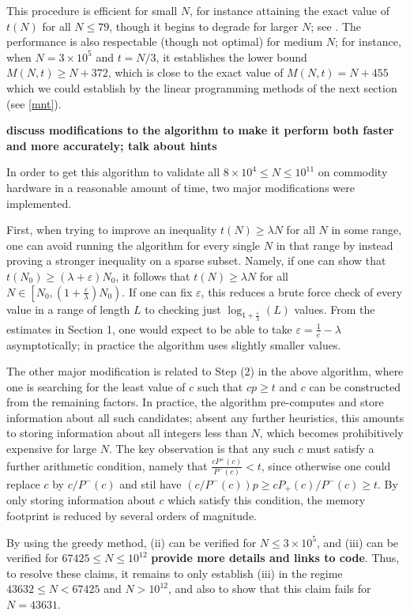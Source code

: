 \documentclass[12pt,a4paper,reqno]{amsart}
\numberwithin{equation}{section}
\theoremstyle{plain}
\theoremstyle{definition}
\newcommand\eps{\varepsilon}
\begin{document}
This procedure is efficient for small $N$, for instance attaining the exact value of $t(N)$ for all $N \leq 79$, though it begins to degrade for larger $N$; see .  The performance is also respectable (though not optimal) for medium $N$; for instance, when $N=3 \times 10^5$ and $t=N/3$, it establishes the lower bound $M(N,t) \geq N+372$, which is close to the exact value of $M(N,t) = N+455$ which we could establish by the linear programming methods of the next section (see \eqref{mnt}).

{\bf discuss modifications to the algorithm to make it perform both faster and more accurately; talk about hints}

In order to get this algorithm to validate all $8 \times 10^4 \leq N \leq 10^{11}$ on commodity hardware in a reasonable amount of time, two major modifications were implemented. 

First, when trying to improve an inequality $t(N) \geq \lambda N$ for all $N$ in some range, one can avoid running the algorithm for every single $N$ in that range by instead proving a stronger inequality on a sparse subset. Namely, if one can show that $t(N_0) \geq (\lambda + \eps)N_0$, it follows that $t(N) \geq \lambda N$ for all $N \in \left[N_0, (1+\frac{\eps}{\lambda})N_0\right)$. If one can fix $\eps$, this reduces a brute force check of every value in a range of length $L$ to checking just $\log_{1+\frac{\eps}{\lambda}}(L)$ values. From the estimates in Section 1, one would expect to be able to take $\eps = \frac{1}{e}-\lambda$ asymptotically; in practice the algorithm uses slightly smaller values. 

The other major modification is related to Step (2) in the above algorithm, where one is searching for the least value of $c$ such that $cp\geq t$ and $c$ can be constructed from the remaining factors. In practice, the algorithm pre-computes and store information about all such candidates; absent any further heuristics, this amounts to storing information about all integers less than $N$, which becomes prohibitively expensive for large $N$. The key observation is that any such $c$ must satisfy a further arithmetic condition, namely that $\frac{cP^+(c)}{P^-(c)} < t$, since otherwise one could replace $c$ by $c/P^-(c)$ and stil have $(c/P^-(c)) p \geq cP_+(c)/P^-(c) \geq t$. By only storing information about $c$ which satisfy this condition, the memory footprint is reduced by several orders of magnitude.

By using the greedy method, (ii) can be verified for $N \leq 3 \times 10^5$, and (iii) can be verified for $67425 \leq N \leq 10^{12}$ {\bf provide more details and links to code}.    Thus, to resolve these claims, it remains to only establish (iii) in the regime $43632 \leq N < 67425$ and $N > 10^{12}$, and also to show that this claim fails for $N=43631$.
\end{document}

